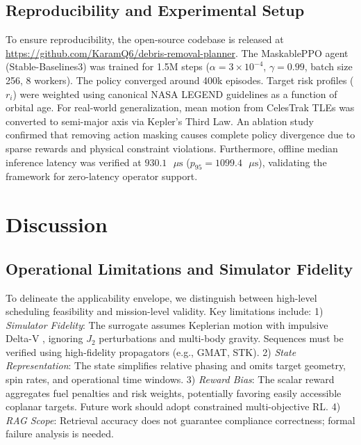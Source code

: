 \documentclass[10pt,conference,a4paper]{IEEEtran}
\begin{document}
\subsection{Reproducibility and Experimental Setup}
To ensure reproducibility, the open-source codebase is released at \url{https://github.com/KaramQ6/debris-removal-planner}. The MaskablePPO agent (Stable-Baselines3) was trained for 1.5M steps ($\alpha = 3 \times 10^{-4}$, $\gamma = 0.99$, batch size 256, 8 workers). The policy converged around 400k episodes. Target risk profiles ($r_i$) were weighted using canonical NASA LEGEND guidelines \cite{legend} as a function of orbital age. For real-world generalization, mean motion from CelesTrak TLEs \cite{celestrak} was converted to semi-major axis via Kepler's Third Law. An ablation study confirmed that removing action masking causes complete policy divergence due to sparse rewards and physical constraint violations. Furthermore, offline median inference latency was verified at $930.1\text{ }\mu\text{s}$ ($p_{95} = 1099.4\text{ }\mu\text{s}$), validating the framework for zero-latency operator support.

\section{Discussion}



\subsection{Operational Limitations and Simulator Fidelity}
To delineate the applicability envelope, we distinguish between high-level scheduling feasibility and mission-level validity. Key limitations include: 1) \textit{Simulator Fidelity}: The surrogate assumes Keplerian motion with impulsive Delta-V \cite{vallado}, ignoring $J_2$ perturbations and multi-body gravity. Sequences must be verified using high-fidelity propagators (e.g., GMAT, STK). 2) \textit{State Representation}: The state simplifies relative phasing and omits target geometry, spin rates, and operational time windows. 3) \textit{Reward Bias}: The scalar reward aggregates fuel penalties and risk weights, potentially favoring easily accessible coplanar targets. Future work should adopt constrained multi-objective RL. 4) \textit{RAG Scope}: Retrieval accuracy does not guarantee compliance correctness; formal failure analysis is needed.
\end{document}
